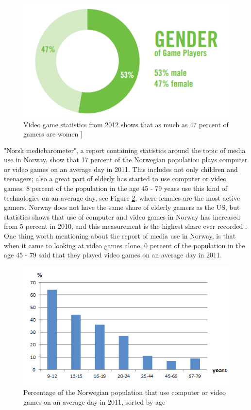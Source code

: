 \begin{figure}
\begin{center}
\includegraphics[scale=0.7]{gendergameplayers}
\caption[Gender of gameplayer]{Video game statistics from 2012 shows that as much as 47 percent of gamers are women \cite{statistics2012real}]}
\label{fig:GenderGamePlayers}
\end{center}
\end{figure}
"Norsk mediebarometer", a report containing statistics around the topic of media use in Norway, show that 17 percent of the Norwegian population plays computer or video games on an average day in 2011. This includes not only children and teenagers; also a great part of elderly has started to use computer or video games. 8 percent of the population in the age 45 - 79 years use this kind of technologies on an average day, see Figure \ref{fig:GameStatisticsNorway}, where females are the most active gamers. Norway does not have the same share of elderly gamers as the US, but statistics shows that use of computer and video games in Norway has increased from 5 percent in 2010, and this measurement is the highest share ever recorded \cite{ssb2010} \cite{ssb2011}. One thing worth mentioning about the report of media use in Norway, is that when it came to looking at video games alone, 0 percent of the population in the age 45 - 79 said that they played video games on an average day in 2011. \cite{ssb2011}
\begin{figure}
\begin{center}
\includegraphics[scale=0.9]{gamestatisticsnorway}
\caption[Use of computer or video games, Norway, 2011]{Percentage of the Norwegian population that use computer or video games on an average day in 2011, sorted by age \cite{ssb2011}}
\label{fig:GameStatisticsNorway}
\end{center}
\end{figure}
       
